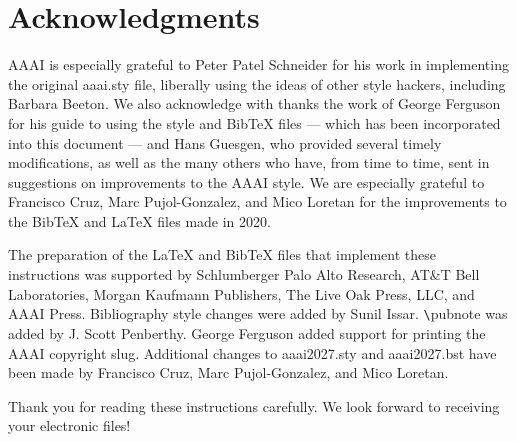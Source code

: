 \section*{Acknowledgments}
AAAI is especially grateful to Peter Patel Schneider for his work in implementing the original aaai.sty file, liberally using the ideas of other style hackers, including Barbara Beeton. We also acknowledge with thanks the work of George Ferguson for his guide to using the style and BibTeX files --- which has been incorporated into this document --- and Hans Guesgen, who provided several timely modifications, as well as the many others who have, from time to time, sent in suggestions on improvements to the AAAI style. We are especially grateful to Francisco Cruz, Marc Pujol-Gonzalez, and Mico Loretan for the improvements to the Bib\TeX{} and \LaTeX{} files made in 2020.

The preparation of the \LaTeX{} and Bib\TeX{} files that implement these instructions was supported by Schlumberger Palo Alto Research, AT\&T Bell Laboratories, Morgan Kaufmann Publishers, The Live Oak Press, LLC, and AAAI Press. Bibliography style changes were added by Sunil Issar. \verb+\+pubnote was added by J. Scott Penberthy. George Ferguson added support for printing the AAAI copyright slug. Additional changes to aaai2027.sty and aaai2027.bst have been made by Francisco Cruz, Marc Pujol-Gonzalez, and Mico Loretan.

\bigskip
\noindent Thank you for reading these instructions carefully. We look forward to receiving your electronic files!

